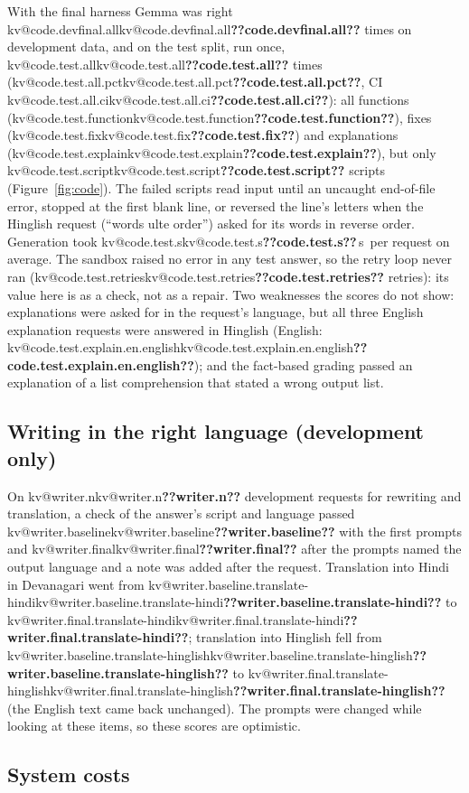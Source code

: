 \documentclass[11pt,a4paper]{article}
\makeatletter
\DeclareRobustCommand{\kv}[1]{\ifcsname kv@#1\endcsname\csname kv@#1\endcsname\else\textbf{??#1??}\fi}
\newcommand{\s}{\,s}
\makeatother
\begin{document}
With the final harness Gemma was right \kv{code.devfinal.all} times on development data, and on the test split, run
once, \kv{code.test.all} times (\kv{code.test.all.pct}, CI \kv{code.test.all.ci}): all functions
(\kv{code.test.function}), fixes (\kv{code.test.fix}) and explanations (\kv{code.test.explain}), but only
\kv{code.test.script} scripts (Figure~\ref{fig:code}). The failed scripts read input until an uncaught end-of-file
error, stopped at the first blank line, or reversed the line's letters when the Hinglish request (``words ulte order'')
asked for its words in reverse order. Generation took \kv{code.test.s}\s\ per request on average. The sandbox raised no
error in any test answer, so the retry loop never ran (\kv{code.test.retries} retries): its value here is as a check,
not as a repair. Two weaknesses the scores do not show: explanations were asked for in the request's language, but all
three English explanation requests were answered in Hinglish (English: \kv{code.test.explain.en.english}); and the
fact-based grading passed an explanation of a list comprehension that stated a wrong output list.

\subsection{Writing in the right language (development only)}

On \kv{writer.n} development requests for rewriting and translation, a check of the answer's script and
language passed \kv{writer.baseline} with the first prompts and
\kv{writer.final} after the prompts named the output language and a note was added after the request. Translation into
Hindi in Devanagari went from \kv{writer.baseline.translate-hindi} to \kv{writer.final.translate-hindi}; translation
into Hinglish fell from \kv{writer.baseline.translate-hinglish} to \kv{writer.final.translate-hinglish} (the English
text came back unchanged). The prompts were changed while looking at these items, so these scores are optimistic.

\subsection{System costs}\label{sec:res-system}

\begin{table}[t]
\centering\small
\caption{Gemma-4-E2B (Q4\_0) loaded with its weights copied or memory-mapped, page cache cold or warm (median of 3
runs each; one session). Output text was byte-identical in all runs.}
\label{tab:systems}

\end{table}
\end{document}
